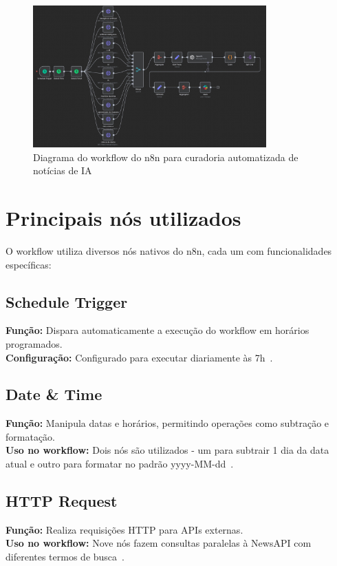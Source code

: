 \documentclass{sftex}
\begin{document}
\begin{figure}[h]
    \centering
    \includegraphics[width=0.8\textwidth]{n8n_workflow.jpg}
    \caption{Diagrama do workflow do n8n para curadoria automatizada de notícias de IA}
    \label{fig:n8n_workflow}
\end{figure}

\section{Principais nós utilizados}

O workflow utiliza diversos nós nativos do n8n, cada um com funcionalidades específicas:

\subsection{Schedule Trigger}
\textbf{Função:} Dispara automaticamente a execução do workflow em horários programados.\\
\textbf{Configuração:} Configurado para executar diariamente às 7h~\cite{n8n_schedule_trigger}.

\subsection{Date \& Time}
\textbf{Função:} Manipula datas e horários, permitindo operações como subtração e formatação.\\
\textbf{Uso no workflow:} Dois nós são utilizados - um para subtrair 1 dia da data atual e outro para formatar no padrão yyyy-MM-dd~\cite{n8n_datetime}.

\subsection{HTTP Request}
\textbf{Função:} Realiza requisições HTTP para APIs externas.\\
\textbf{Uso no workflow:} Nove nós fazem consultas paralelas à NewsAPI com diferentes termos de busca~\cite{n8n_http_request}.
\end{document}
